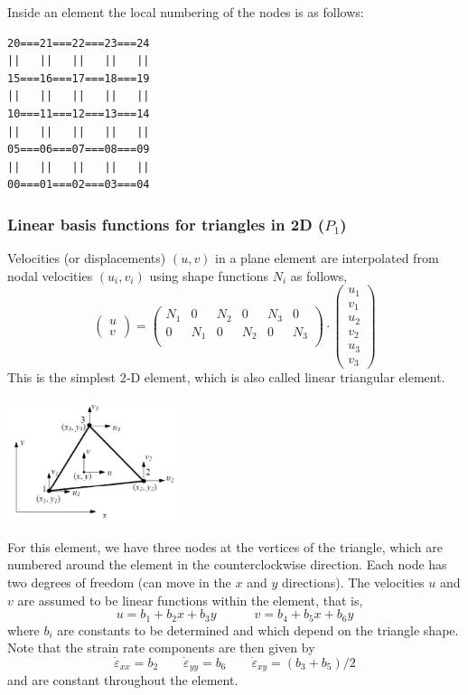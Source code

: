 Inside an element the local numbering of the nodes is as follows:
\begin{verbatim}
20===21===22===23===24
||   ||   ||   ||   ||
15===16===17===18===19 
||   ||   ||   ||   || 
10===11===12===13===14 
||   ||   ||   ||   || 
05===06===07===08===09 
||   ||   ||   ||   || 
00===01===02===03===04 
\end{verbatim}




\subsubsection{Linear basis functions for triangles in 2D ($P_1$)}

Velocities (or displacements) $(u,v)$ in a plane element are interpolated from nodal velocities
$(u_i,v_i)$ using shape functions $N_i$ as follows,
\[
\left(
\begin{array}{c}
u \\v
\end{array}
\right)
=
\left(
\begin{array}{cccccc}
N_1 & 0 & N_2 & 0 & N_3 & 0\\
0 & N_1 & 0 & N_2 & 0 & N_3\\
\end{array}
\right)
\cdot
\left(
\begin{array}{c}
u_1 \\ v_1 \\ u_2 \\ v_2 \\ u_3 \\ v_3
\end{array}
\right)
\]
This is the simplest 2‐D element, which is also called linear triangular element.
\begin{center}
\includegraphics[width=5cm]{images/shapefunctions/triangleFEM1}
\end{center}

For this element, we have three nodes at the vertices of the triangle, which are 
numbered around the element in the counterclockwise direction. 
Each node has two degrees of freedom (can move in the $x$ and $y$ directions). 
The velocities $u$ and $v$ are assumed to be linear functions within the element, that is, 
\[
u=b_1 +b_2x+b_3y
\quad\quad\quad
v=b_4 +b_5x+b_6y
\]
where $b_i$ are constants to be determined and which depend on the triangle shape.
Note that the strain rate components are then given by
\[
\dot\varepsilon_{xx}=b_2 
\quad\quad
\dot\varepsilon_{yy}=b_6 
\quad\quad
\dot\varepsilon_{xy}=(b_3+b_5)/2
\]
and are constant throughout the element.

